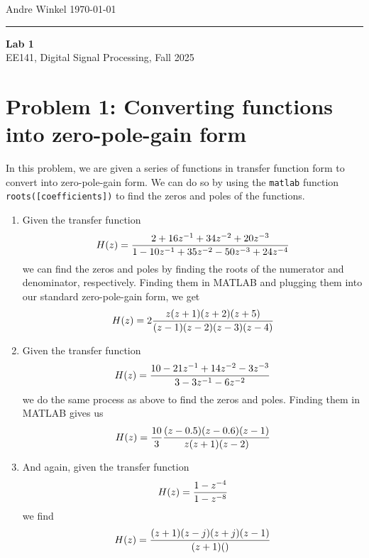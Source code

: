 \documentclass[11pt]{article}
\begin{document}
\noindent Andre Winkel \hfill \today \\
\rule{\textwidth}{0.4pt}

\begin{center} \large {\textbf{Lab 1}} \\[0em] {EE141, Digital Signal Processing, Fall 2025} \end{center}

\section{Problem 1: Converting functions into zero-pole-gain form}
In this problem, we are given a series of functions in transfer function form 
to convert into zero-pole-gain form. We can do so by using the \texttt{matlab} function 
\texttt{roots([coefficients])} to find the zeros and poles of the functions.
\begin{enumerate}[label=\textbf{\alph*)}, leftmargin=2.6em]
    \item Given the transfer function
    \begin{equation} \notag
        H(z) = \frac{2+16z^{-1}+34z^{-2}+20z^{-3}}{1-10z^{-1}+35z^{-2}-50z^{-3}+24z^{-4}}
    \end{equation}
    we can find the zeros and poles by finding the roots of the numerator and denominator, respectively.
    Finding them in MATLAB and plugging them into our standard zero-pole-gain form, we get
    \begin{equation} \notag
        H(z) = 2\frac{z(z+1)(z+2)(z+5)}{(z-1)(z-2)(z-3)(z-4)}
    \end{equation}

    \item Given the transfer function
    \begin{equation} \notag
        H(z) = \frac{10-21z^{-1}+14z^{-2}-3z^{-3}}{3-3z^{-1}-6z^{-2}}
    \end{equation}
    we do the same process as above to find the zeros and poles. Finding them in MATLAB gives us 
    \begin{equation} \notag
        H(z) = \frac{10}{3}\frac{(z-0.5)(z-0.6)(z-1)}{z(z+1)(z-2)}
    \end{equation}

    \item And again, given the transfer function
    \begin{equation} \notag
        H(z) = \frac{1-z^{-4}}{1-z^{-8}}
    \end{equation}
    we find
    \begin{equation} \notag
        H(z) = \frac{(z+1)(z-j)(z+j)(z-1)}{(z+1)()}
    \end{equation}
\end{enumerate}
\end{document}
